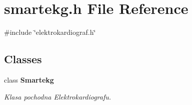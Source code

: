 \section{smartekg.\+h File Reference}
\label{smartekg_8h}
{\ttfamily \#include \char`\"{}elektrokardiograf.\+h\char`\"{}}\newline
\subsection*{Classes}
\begin{DoxyCompactItemize}
\item 
class \textbf{ Smartekg}
\begin{DoxyCompactList}\small\item\em Klasa pochodna Elektrokardiografu. \end{DoxyCompactList}\end{DoxyCompactItemize}
